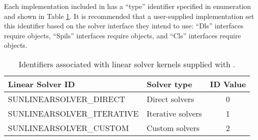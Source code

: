 Each {\sunlinsol} implementation included in {\sundials} has a ``type''
identifier specified in enumeration and shown in Table \ref{t:linsolIDs}.
It is recommended that a user-supplied {\sunlinsol} implementation set
this identifier based on the {\sundials} solver interface they intend
to use: ``Dls'' interfaces require 
{\sunlinsol} objects, ``Spils'' interfaces require 
 objects, and ``Cls'' interfaces 
require  objects. 

\begin{table}
\centering
\caption{Identifiers associated with linear solver kernels supplied with {\sundials}.}
\label{t:linsolIDs}
\medskip
\begin{tabular}{|l|l|c|}
\hline
{\bf Linear Solver ID} & {\bf Solver type} & {\bf ID Value} \\
\hline
SUNLINEARSOLVER\_DIRECT      & Direct solvers     & 0 \\ 
SUNLINEARSOLVER\_ITERATIVE   & Iterative solvers  & 1 \\
SUNLINEARSOLVER\_CUSTOM      & Custom solvers     & 2 \\
\hline
\end{tabular}
\end{table}


\newlength{\colOne}
\newlength{\colTwo}
\setlength{\colTwo}{\textwidth}
\addtolength{\colTwo}{-0.5in}
\addtolength{\colTwo}{-\colOne}

